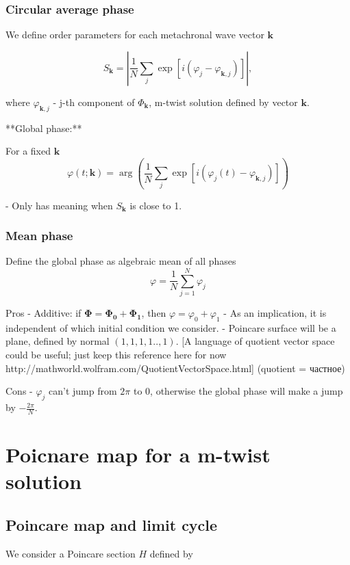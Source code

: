 \documentclass[a4paper,12pt]{article}
\begin{document}
\subsubsection*{Circular average phase}

We define order parameters
for each metachronal wave vector $\mathbf{k}$

$$S_\mathbf{k} = \left| \frac{1}{N}\sum_j \exp\left[ i ( \varphi_j - \varphi_{\mathbf{k},j} ) \right] \right|,$$

where $\varphi_{\mathbf{k},j}$ - j-th component of $\Phi_\mathbf{k}$, m-twist solution defined by vector $\mathbf{k}$.

**Global phase:**

For a fixed $\mathbf{k}$
$$\varphi(t; \mathbf{k}) = \arg \left( \frac{1}{N}\sum_j \exp\left[ i ( \varphi_j(t) - \varphi_{\mathbf{k},j} ) \right] \right) $$

- Only has meaning when $S_\mathbf{k}$ is close to 1.

\subsubsection*{Mean phase}

Define the global phase as algebraic mean of all phases
$$
\varphi =  \frac{1}{N}\sum_{j=1}^{N} \varphi_j
$$

Pros
- Additive: if $\mathbf{\Phi} = \mathbf{\Phi_0}+ \mathbf{\Phi_1} $, then $\varphi = \varphi_0 + \varphi_1$
- As an implication, it is independent of which initial condition we consider.
- Poincare surface will be a plane, defined by normal $(1,1,1,1..,1)$.
  [A language of quotient vector space could be useful; just keep this reference here for now http://mathworld.wolfram.com/QuotientVectorSpace.html]
  (quotient = частное)

Cons
- $\varphi_j$ can't jump from  $2 \pi$ to $0$, otherwise the global phase will make a jump by $- \frac{2 \pi}{N}$.

\section*{Poicnare map for a m-twist solution}
\subsection*{Poincare map and limit cycle}
We consider a Poincare section $H$ defined by
\end{document}

